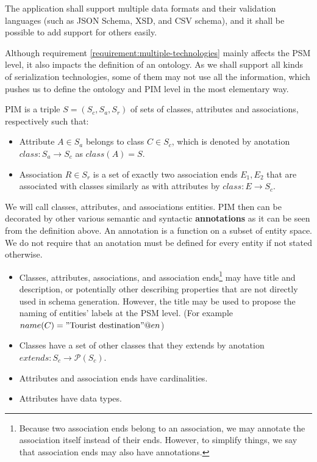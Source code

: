 \begin{requirement}
    \label{requirement:multiple-technologies}
    The application shall support multiple data formats and their validation languages (such as JSON Schema, XSD, and CSV schema), and it shall be possible to add support for others easily.
\end{requirement}

Although requirement \ref{requirement:multiple-technologies} mainly affects the PSM level, it also impacts the definition of an ontology. As we shall support all kinds of serialization technologies, some of them may not use all the information, which pushes us to define the ontology and PIM level in the most elementary way.

\begin{definition}[PIM] PIM is a triple $S=(S_c, S_a, S_r)$ of sets of classes, attributes and associations, respectively such that:
    \begin{itemize}
        \item Attribute $A \in S_a$ belongs to class $C \in S_c$, which is denoted by anotation ${class}: S_a \rightarrow S_c$ as ${class}(A)=S$.
        \item Association $R \in S_r$ is a set of exactly two association ends ${E_1, E_2}$ that are associated with classes similarly as with attributes by ${class}: E \rightarrow S_c$.
    \end{itemize}

    We will call classes, attributes, and associations entities. PIM then can be decorated by other various semantic and syntactic \textbf{annotations} as it can be seen from the definition above. An annotation is a function on a subset of entity space. We do not require that an anotation must be defined for every entity if not stated otherwise. %

    \begin{itemize}
        \item Classes, attributes, associations, and association ends\footnote{Because two association ends belong to an association, we may annotate the association itself instead of their ends. However, to simplify things, we say that association ends may also have annotations.} may have title and description, or potentially other describing properties that are not directly used in schema generation. However, the title may be used to propose the naming of entities' labels at the PSM level. (For example $name(C)="\textrm{Tourist destination}"@en$)
        \item Classes have a set of other classes that they extends by anotation $extends: S_c \rightarrow \mathcal{P}(S_c)$.
        \item Attributes and association ends have cardinalities.
        \item Attributes have data types.
    \end{itemize}
\end{definition}

